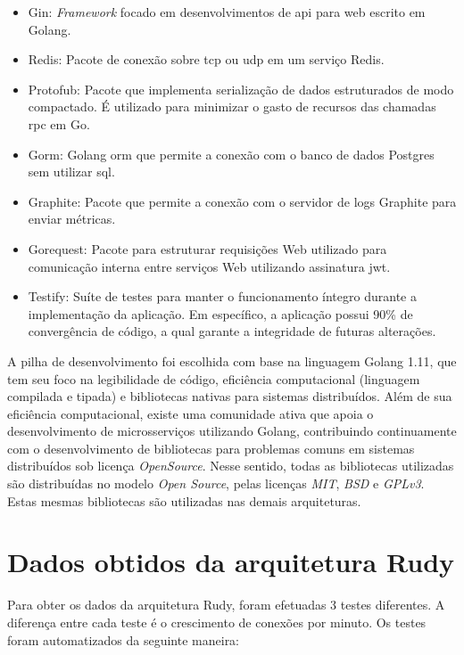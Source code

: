 \begin{itemize}
    \item Gin: \textit{Framework} focado em desenvolvimentos de \ac{api} para web escrito em Golang.
    \item Redis: Pacote de conexão sobre \ac{tcp} ou \ac{udp} em um serviço Redis.
    \item Protofub: Pacote que implementa serialização de dados estruturados de modo compactado. É utilizado para minimizar o gasto de recursos das chamadas \ac{rpc} em Go.
    \item Gorm: Golang \ac{orm} que permite a conexão com o banco de dados Postgres sem utilizar \ac{sql}.
    \item Graphite: Pacote que permite a conexão com o servidor de logs Graphite para enviar métricas.
    \item Gorequest: Pacote para estruturar requisições Web utilizado para comunicação interna entre serviços Web utilizando assinatura \ac{jwt}.
    \item Testify: Suíte de testes para manter o funcionamento íntegro durante a implementação da aplicação. Em específico, a aplicação possui 90\% de convergência de código, a qual garante a integridade de futuras alterações.
\end{itemize}

A pilha de desenvolvimento foi escolhida com base na linguagem Golang 1.11, que tem seu foco na legibilidade de código, eficiência computacional (linguagem compilada e tipada) e bibliotecas nativas para sistemas distribuídos.
%
Além de sua eficiência computacional, existe uma comunidade ativa que apoia o desenvolvimento de microsserviços utilizando Golang, contribuindo continuamente com o desenvolvimento de bibliotecas para problemas comuns em sistemas distribuídos sob licença \textit{OpenSource}.
%
Nesse sentido, todas as bibliotecas utilizadas são distribuídas no modelo \textit{Open Source}, pelas licenças \textit{MIT}, \textit{BSD} e \textit{GPLv3}.
%
Estas mesmas bibliotecas são utilizadas nas demais arquiteturas.

 
\section{Dados obtidos da arquitetura Rudy}
\label{sec:dados_rudy}
Para obter os dados da arquitetura Rudy, foram efetuadas 3 testes diferentes.
%
A diferença entre cada teste é o crescimento de conexões por minuto.
%
Os testes foram automatizados da seguinte maneira:

